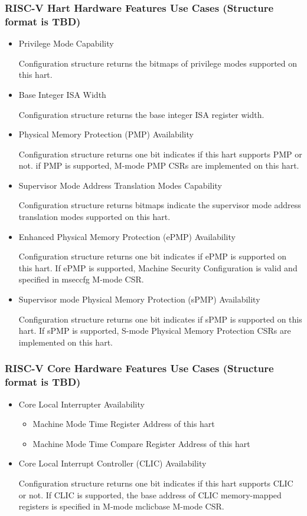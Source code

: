 \subsubsection{RISC-V Hart Hardware Features Use Cases (Structure format is TBD)}
\begin{itemize}
    \item Privilege Mode Capability

    Configuration structure returns the bitmaps of privilege modes supported on this hart.
    \item Base Integer ISA Width

    Configuration structure returns the base integer ISA register width.
    \item Physical Memory Protection (PMP) Availability

    Configuration structure returns one bit indicates if this hart supports PMP or not. if PMP is supported, M-mode PMP
    CSRs are implemented on this hart.
    \item Supervisor Mode Address Translation Modes Capability
    
    Configuration structure returns bitmaps indicate the supervisor mode address translation modes supported on this hart.
    
    \item Enhanced Physical Memory Protection (ePMP) Availability
    
    Configuration structure returns one bit indicates if ePMP is supported on this hart. If ePMP is supported,
    Machine Security Configuration is valid and specified in mseccfg M-mode CSR.
    \item Supervisor mode Physical Memory Protection (sPMP) Availability
    
    Configuration structure returns one bit indicates if sPMP is supported on this hart. If sPMP is supported,
    S-mode Physical Memory Protection CSRs are implemented on this hart.
\end{itemize}

\subsubsection{RISC-V Core Hardware Features Use Cases (Structure format is TBD)}
\begin{itemize}
    \item Core Local Interrupter Availability
    \begin{itemize}    
        \item Machine Mode Time Register Address of this hart
        \item Machine Mode Time Compare Register Address of this hart        
    \end{itemize}
    \item Core Local Interrupt Controller (CLIC) Availability
    
    Configuration structure returns one bit indicates if this hart supports CLIC or not. If CLIC is supported,
    the base address of CLIC memory-mapped registers is specified in M-mode mclicbase M-mode CSR.
    
\end{itemize}
